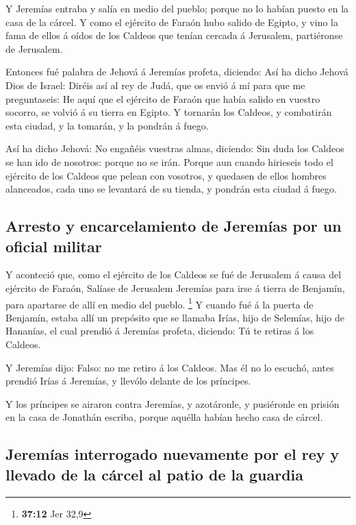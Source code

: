  Y Jeremías entraba y salía en medio del pueblo; porque no
lo habían puesto en la casa de la cárcel.  Y como el
ejército de Faraón hubo salido de Egipto, y vino la fama de ellos á
oídos de los Caldeos que tenían cercada á Jerusalem, partiéronse de
Jerusalem.

 Entonces fué palabra de Jehová á Jeremías profeta,
diciendo:  Así ha dicho Jehová Dios de Israel: Diréis así al
rey de Judá, que os envió á mí para que me preguntaseis: He aquí que el
ejército de Faraón que había salido en vuestro socorro, se volvió á su
tierra en Egipto.  Y tornarán los Caldeos, y combatirán esta
ciudad, y la tomarán, y la pondrán á fuego.

 Así ha dicho Jehová: No engañéis vuestras almas, diciendo:
Sin duda los Caldeos se han ido de nosotros: porque no se irán.
 Porque aun cuando hirieseis todo el ejército de los
Caldeos que pelean con vosotros, y quedasen de ellos hombres alanceados,
cada uno se levantará de su tienda, y pondrán esta ciudad á fuego.

\hypertarget{arresto-y-encarcelamiento-de-jeremuxedas-por-un-oficial-militar}{%
\subsection{Arresto y encarcelamiento de Jeremías por un oficial
militar}\label{arresto-y-encarcelamiento-de-jeremuxedas-por-un-oficial-militar}}

 Y aconteció que, como el ejército de los Caldeos se fué de
Jerusalem á causa del ejército de Faraón,  Salíase de
Jerusalem Jeremías para irse á tierra de Benjamín, para apartarse de
allí en medio del pueblo. \footnote{\textbf{37:12} Jer 32,9}
 Y cuando fué á la puerta de Benjamín, estaba allí un
prepósito que se llamaba Irías, hijo de Selemías, hijo de Hananías, el
cual prendió á Jeremías profeta, diciendo: Tú te retiras á los Caldeos.

 Y Jeremías dijo: Falso: no me retiro á los Caldeos. Mas él
no lo escuchó, antes prendió Irías á Jeremías, y llevólo delante de los
príncipes.

 Y los príncipes se airaron contra Jeremías, y azotáronle,
y pusiéronle en prisión en la casa de Jonathán escriba, porque aquélla
habían hecho casa de cárcel.

\hypertarget{jeremuxedas-interrogado-nuevamente-por-el-rey-y-llevado-de-la-cuxe1rcel-al-patio-de-la-guardia}{%
\subsection{Jeremías interrogado nuevamente por el rey y llevado de la
cárcel al patio de la
guardia}\label{jeremuxedas-interrogado-nuevamente-por-el-rey-y-llevado-de-la-cuxe1rcel-al-patio-de-la-guardia}}

